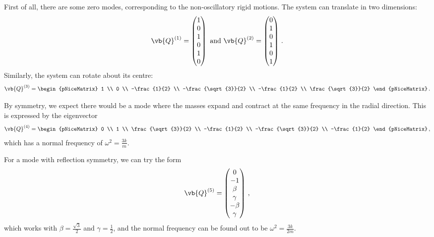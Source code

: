 \documentclass{article}
\theoremstyle{plain}\theoremheaderfont{\normalfont\itshape}\theorembodyfont{\rmfamily}\theoremseparator{.}\newtheorem*{rem}{Remark}\newtheorem*{ex}{Example}\newtheorem*{proof}{Proof}\newtheorem*{altp}{Alternative proof}
\theoremstyle{plain}\theoremheaderfont{\normalfont\bfseries}\theorembodyfont{\rmfamily}\theoremseparator{.}\newtheorem{thm}{Theorem}[section]\newtheorem{lem}[thm]{Lemma}\newtheorem{prop}[thm]{Proposition}\newtheorem*{cor}{Corollary}\newtheorem{defn}[thm]{Definition}\newtheorem{clm}[thm]{Claim}\newtheorem{clminproof}{Claim}
\theoremstyle{break}\theoremheaderfont{\normalfont\itshape}\theorembodyfont{\rmfamily}\theoremseparator{.\medskip}\newtheorem*{proofskip}{Proof}\newtheorem*{exs}{Examples}\newtheorem*{rems}{Remarks}
\theoremstyle{break}\theoremheaderfont{\normalfont\bfseries}\theorembodyfont{\rmfamily}\theoremseparator{.\medskip}\newtheorem{lemskip}[thm]{Lemma}\newtheorem{defnskip}[thm]{Definition}\newtheorem{propskip}[thm]{Proposition}\newtheorem{thmskip}[thm]{Theorem}
\numberwithin{equation}{section}
\begin{document}
	First of all, there are some zero modes, corresponding to the non-oscillatory rigid motions. The system can translate in two dimensions:
	\[\vb{Q}^{(1)}=\begin{pmatrix}
		1 \\ 0 \\ 1 \\ 0 \\ 1 \\ 0
	\end{pmatrix}\text{ and }\vb{Q}^{(2)}=\begin{pmatrix}
		0 \\ 1 \\ 0 \\ 1 \\ 0 \\ 1
	\end{pmatrix}\,.\]
	Similarly, the system can rotate about its centre:
	\[\vb{Q}^{(3)}=\begin{pNiceMatrix}
		1 \\ 0 \\ -\frac{1}{2} \\ -\frac{\sqrt{3}}{2} \\ -\frac{1}{2} \\ \frac{\sqrt{3}}{2}
	\end{pNiceMatrix}\,.\]

	By symmetry, we expect there would be a mode where the masses expand and contract at the same frequency in the radial direction. This is expressed by the eigenvector
	\[\vb{Q}^{(4)}=\begin{pNiceMatrix}
		0 \\ 1 \\ \frac{\sqrt{3}}{2} \\ -\frac{1}{2} \\ -\frac{\sqrt{3}}{2} \\ -\frac{1}{2}
	\end{pNiceMatrix}\,,\]
	which has a normal frequency of \(\omega^2=\frac{3k}{m}\).

	For a mode with reflection symmetry, we can try the form
	\[\vb{Q}^{(5)}=\begin{pmatrix}
		0 \\ -1 \\ \beta \\ \gamma \\ -\beta \\ \gamma
	\end{pmatrix}\,,\]
	which works with \(\beta=\frac{\sqrt{3}}{2}\) and \(\gamma=\frac{1}{2}\), and the normal frequency can be found out to be \(\omega^2=\frac{3k}{2m}\).
\end{document}
